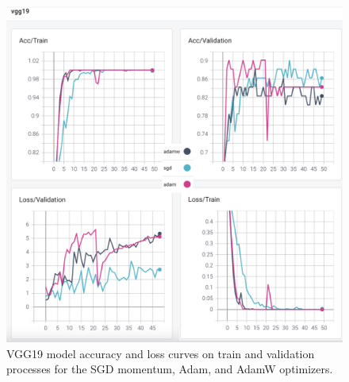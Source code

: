 \begin{figure}[!h]
	\centering
	\includegraphics[width=\linewidth]{fig/vgg19.png}
	\vspace{2mm}
	\caption{VGG19 model accuracy and loss curves on train and validation processes for the SGD momentum, Adam, and AdamW optimizers.}
	\label{fig:vgg19_plots}
\end{figure}

